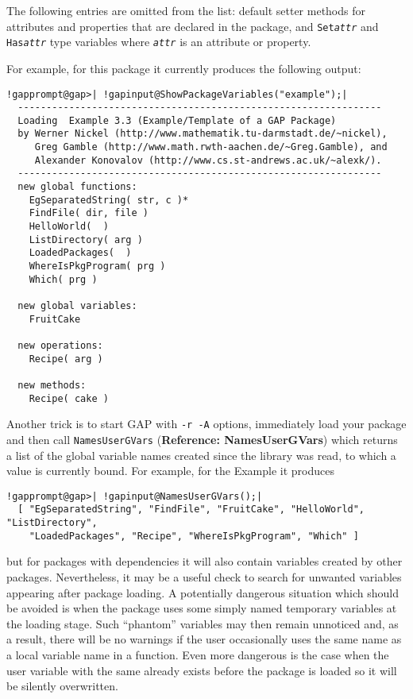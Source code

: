 \documentclass[a4paper,11pt]{report}
\begin{document}
{{ The following entries are omitted from the list: default setter methods for
attributes and properties that are declared in the package, and \texttt{Set\mbox{\texttt{\mdseries\slshape attr}}} and \texttt{Has\mbox{\texttt{\mdseries\slshape attr}}} type variables where \mbox{\texttt{\mdseries\slshape attr}} is an attribute or property. 

 For example, for this package it currently produces the following output: 
\begin{Verbatim}[commandchars=!@|,fontsize=\small,frame=single,label=Example]
  !gapprompt@gap>| !gapinput@ShowPackageVariables("example");|
  ----------------------------------------------------------------
  Loading  Example 3.3 (Example/Template of a GAP Package)
  by Werner Nickel (http://www.mathematik.tu-darmstadt.de/~nickel),
     Greg Gamble (http://www.math.rwth-aachen.de/~Greg.Gamble), and
     Alexander Konovalov (http://www.cs.st-andrews.ac.uk/~alexk/).
  ----------------------------------------------------------------
  new global functions:
    EgSeparatedString( str, c )*
    FindFile( dir, file )
    HelloWorld(  )
    ListDirectory( arg )
    LoadedPackages(  )
    WhereIsPkgProgram( prg )
    Which( prg )
  
  new global variables:
    FruitCake
  
  new operations:
    Recipe( arg )
  
  new methods:
    Recipe( cake )
\end{Verbatim}
 Another trick is to start \textsf{GAP} with \texttt{-r -A} options, immediately load your package and then call \texttt{NamesUserGVars} (\textbf{Reference: NamesUserGVars}) which returns a list of the global variable names created since the library
was read, to which a value is currently bound. For example, for the \textsf{Example} it produces 
\begin{Verbatim}[commandchars=!@|,fontsize=\small,frame=single,label=Example]
  !gapprompt@gap>| !gapinput@NamesUserGVars();|
  [ "EgSeparatedString", "FindFile", "FruitCake", "HelloWorld", "ListDirectory",
    "LoadedPackages", "Recipe", "WhereIsPkgProgram", "Which" ]
\end{Verbatim}
 but for packages with dependencies it will also contain variables created by
other packages. Nevertheless, it may be a useful check to search for unwanted
variables appearing after package loading. A potentially dangerous situation
which should be avoided is when the package uses some simply named temporary
variables at the loading stage. Such ``phantom'' variables may then remain unnoticed and, as a result, there will be no
warnings if the user occasionally uses the same name as a local variable name
in a function. Even more dangerous is the case when the user variable with the
same already exists before the package is loaded so it will be silently
overwritten. }

}
\end{document}
